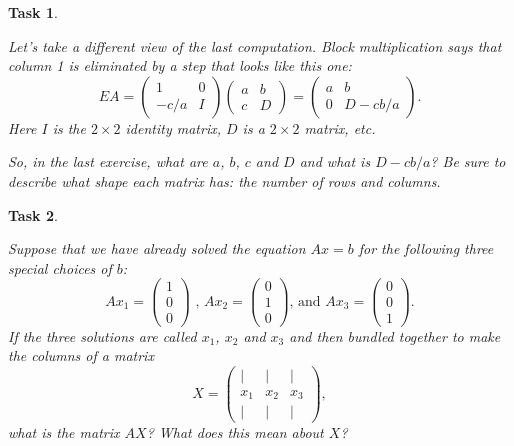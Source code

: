 \documentclass[10pt,]{book}
\theoremstyle{plain}
\numberwithin{equation}{section}
\newtheorem{task}{Task}[chapter]
\begin{document}
\begin{task}
\label{task-60}

          Let's take a different view of the last computation.
          Block multiplication says that column 1 is eliminated by
          a step that looks like this one:
          \[
            EA = \begin{pmatrix} 1 & 0 \\ -c/a & I \end{pmatrix}
            \begin{pmatrix} a & b \\ c & D \end{pmatrix} =
            \begin{pmatrix} a & b \\ 0 & D - cb/a \end{pmatrix}.
          \]
          Here \(I\) is the \(2\times 2\) identity matrix, \(D\) is a
          \(2\times 2\) matrix, etc.
\par

          So, in the last exercise, what are \(a\), \(b\), \(c\)
          and \(D\) and what
          is \(D-cb/a\)? Be sure to describe what shape each matrix has: the
          number of rows and columns.
\end{task}
\begin{task}
\label{task-61}

        Suppose that we have already solved the equation \(Ax=b\) for the
        following three special choices of \(b\):
        \[
          Ax_1 = \begin{pmatrix} 1 \\ 0 \\ 0 \end{pmatrix} \text{ , } Ax_2 = \begin{pmatrix} 0 \\ 1 \\ 0 \end{pmatrix} \text{, and } Ax_3 = \begin{pmatrix} 0 \\ 0 \\ 1 \end{pmatrix}.
        \]
        If the three solutions are called \(x_1\), \(x_2\) and \(x_3\)
        and then bundled together to make the columns of a matrix
        \[X =  \begin{pmatrix} | & | & | \\
          x_1 & x_2 & x_3 \\ | & | & |
          \end{pmatrix},
        \] what is the matrix \(AX\)? What does this mean about \(X\)?
      \end{task}
\clearpage
\typeout{************************************************}
\typeout{************************************************}
\end{document}
